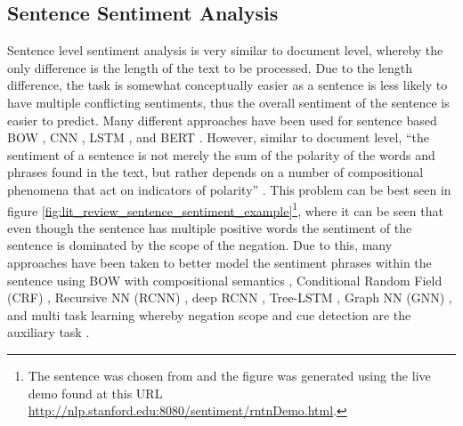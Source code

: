\subsection{Sentence Sentiment Analysis}
Sentence level sentiment analysis is very similar to document level, whereby the only difference is the length of the text to be processed. Due to the length difference, the task is somewhat conceptually easier as a sentence is less likely to have multiple conflicting sentiments, thus the overall sentiment of the sentence is easier to predict. Many different approaches have been used for sentence based BOW \citep{wang-manning-2012-baselines}, CNN \citep{kim-2014-convolutional, kalchbrenner-etal-2014-convolutional}, LSTM \citep{brahma2018improved}, and BERT \citep{devlin-etal-2019-bert}. However, similar to document level, ``the sentiment of a sentence is not merely the sum of the polarity of the words and phrases found in the text, but rather depends on a number of compositional phenomena that act on indicators of polarity'' \citep{barnes2019improving}. This problem can be best seen in figure \ref{fig:lit_review_sentence_sentiment_example}\footnote{The sentence was chosen from \citet{barnes2019improving} and the figure was generated using the live demo found at this URL \url{http://nlp.stanford.edu:8080/sentiment/rntnDemo.html}.}, where it can be seen that even though the sentence has multiple positive words the sentiment of the sentence is dominated by the scope of the negation. Due to this, many approaches have been taken to better model the sentiment phrases within the sentence using BOW with compositional semantics \citep{choi-cardie-2008-learning}, Conditional Random Field (CRF) \citep{nakagawa-etal-2010-dependency}, Recursive NN (RCNN) \citep{socher-etal-2012-semantic}, deep RCNN \citep{irsoy2014deep}, Tree-LSTM \citep{tai-etal-2015-improved}, Graph NN (GNN) \citep{zhang-zhang-2019-tree}, and multi task learning whereby negation scope and cue detection are the auxiliary task \citep{barnes2019improving}.

